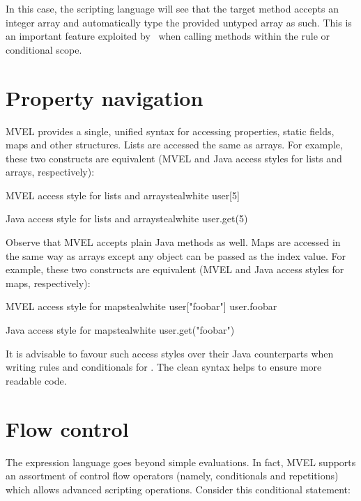 In this case, the scripting language will see that the target method accepts an integer array and automatically type the provided untyped array as such. This is an important feature exploited by \arara\ when calling methods within the rule or conditional scope.

\section{Property navigation}
\label{sec:propertynavigation}

\gls{MVEL} provides a single, unified syntax for accessing properties, static fields, maps and other structures. Lists are accessed the same as arrays. For example, these two constructs are equivalent (\gls{MVEL} and Java access styles for lists and arrays, respectively):

\begin{codebox}{MVEL access style for lists and arrays}{teal}{\icnote}{white}
user[5]
\end{codebox}

\begin{codebox}{Java access style for lists and arrays}{teal}{\icnote}{white}
user.get(5)
\end{codebox}

Observe that \gls{MVEL} accepts plain Java methods as well. Maps are accessed in the same way as arrays except any object can be passed as the index value. For example, these two constructs are equivalent (\gls{MVEL} and Java access styles for maps, respectively):

\begin{codebox}{MVEL access style for maps}{teal}{\icnote}{white}
user["foobar"]
user.foobar
\end{codebox}

\begin{codebox}{Java access style for maps}{teal}{\icnote}{white}
user.get("foobar")
\end{codebox}

It is advisable to favour such access styles over their Java counterparts when writing rules and conditionals for \arara. The clean syntax helps to ensure more readable code.

\section{Flow control}
\label{sec:mvelflowcontrol}

The expression language goes beyond simple evaluations. In fact, \gls{MVEL} supports an assortment of control flow operators (namely, conditionals and repetitions) which allows advanced scripting operations. Consider this conditional statement:


